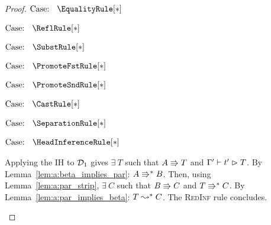 \begin{proof}
    $\text{Case: }\begin{array}{c} \EqualityRule[*] \end{array}$
    \begin{proofcase}
    \end{proofcase}

    $\text{Case: }\begin{array}{c} \ReflRule[*] \end{array}$
    \begin{proofcase}
    \end{proofcase}

    $\text{Case: }\begin{array}{c} \SubstRule[*] \end{array}$
    \begin{proofcase}
    \end{proofcase}

    $\text{Case: }\begin{array}{c} \PromoteFstRule[*] \end{array}$
    \begin{proofcase}
    \end{proofcase}

    $\text{Case: }\begin{array}{c} \PromoteSndRule[*] \end{array}$
    \begin{proofcase}
    \end{proofcase}

    $\text{Case: }\begin{array}{c} \CastRule[*] \end{array}$
    \begin{proofcase}
    \end{proofcase}

    $\text{Case: }\begin{array}{c} \SeparationRule[*] \end{array}$
    \begin{proofcase}
    \end{proofcase}

    $\text{Case: }\begin{array}{c} \HeadInferenceRule[*] \end{array}$
    \begin{proofcase}
        Applying the IH to $\mathcal{D}_{1}$ gives $\exists\ T$ such that $A \Rrightarrow T$ and $\Gamma^\prime \vdash t^\prime \vartriangleright T$.
        By Lemma~\ref{lem:a:beta_implies_par}: $A \Rrightarrow^* B$.
        Then, using Lemma~\ref{lem:a:par_strip}, $\exists\ C$ such that $B \Rrightarrow C$ and $T \Rrightarrow^* C$.
        By Lemma~\ref{lem:a:par_implies_beta}: $T \leadsto^* C$.
        The \textsc{RedInf} rule concludes.
    \end{proofcase}


\end{proof}
